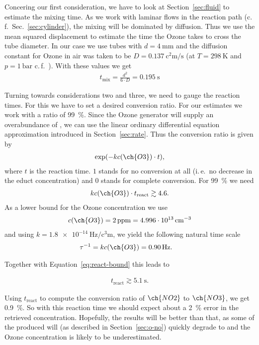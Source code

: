 Concering our first consideration, we have to look at
Section~\ref{sec:fluid} to estimate the mixing time. As we work with
laminar flows in the reaction path (c.\,f.\ Sec.~\ref{sec:cylinder}),
the mixing will be dominated by diffusion. Thus we use the mean
squared displacement to estimate the time the Ozone takes to cross the
tube diameter. In our case we use tubes with $d =
\SI{4}{\milli\meter}$ and the diffusion constant for Ozone in air was
taken to be $D = \SI{0.137}{\square\centi\meter\per\second}$ (at $T =
\SI{298}{\kelvin}$ and $p = \SI{1}{\text{bar}}$
c.\,f.~\cite{diff-ozone}). With these values we get
\begin{align*}
  t_{\text{mix}} = \frac{d^2}{6\cdot D} = \SI{0.195}{\second}
\end{align*}

Turning towards considerations two and three, we need to gauge the
reaction times. For this we have to set a desired conversion
ratio. For our estimates we work with a ratio of \SI{99}{\%}. 
Since the Ozone generator will supply an
overabundance of , we can use the linear ordinary
differential equation approximation introduced in
Section~\ref{sec:rate}. Thus the conversion ratio is
given by
\begin{align*}
  \exp(-kc(\ch{O3})\cdot t),
\end{align*}
where $t$ is the reaction time. $1$ stands for no
conversion at all (i.\,e.\ no decrease in the educt concentration) and
$0$ stands for complete conversion. For \SI{99}{\%} we need
\begin{align}
  kc(\ch{O3}) \cdot t_{\text{react}} \gtrsim 4.6. \label{eq:react-bound}
\end{align}
As a lower bound for the Ozone concentration we use
\begin{align*}
  c(\ch{O3}) = \SI{2}{ppm} = \SI{4.996e13}{\per\cubic\centi\meter} 
\end{align*}
and using $k = \SI{1.8e-14}{\hertz\per\cubic\centi\meter}$, we yield
the following natural time scale
\begin{align*}
  \tau^{-1} & = k c(\ch{O3}) = \SI{0.90}{\hertz}.
\end{align*}

Together with Equation~\eqref{eq:react-bound} this leads to

\begin{align*}
  t_{\text{react}} \gtrsim \SI{5.1}{\second}.
\end{align*}

Using $t_{\text{react}}$ to compute the conversion ratio of
$\ch{NO2}$ to $\ch{NO3}$, we get \SI{0.9}{\%}. So with this reaction
time we should expect about a \SI{2}{\%} error in the retrieved
 concentration. Hopefully, the results will be better than
that, as some of the produced  will (as described in
Section~\ref{sec:o-no}) quickly degrade to  and the Ozone
concentration is likely to be underestimated.

